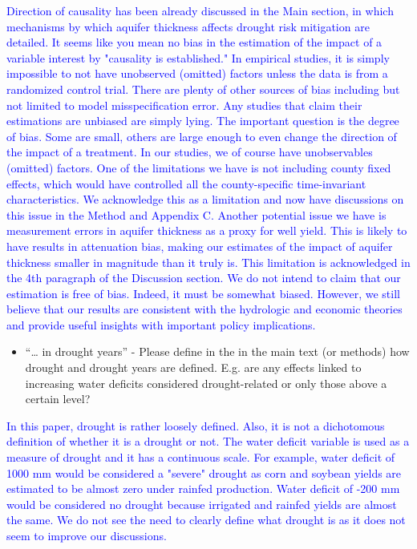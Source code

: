 \documentclass[
]{article}
\providecommand{\tightlist}{%
  \setlength{\itemsep}{0pt}\setlength{\parskip}{0pt}}
\begin{document}
\textcolor{blue}{Direction of causality has been already discussed in the Main section, in which mechanisms by which aquifer thickness affects drought risk mitigation are detailed. It seems like you mean no bias in the estimation of the impact of a variable interest by "causality is established." In empirical studies, it is simply impossible to not have unobserved (omitted) factors unless the data is from a randomized control trial. There are plenty of other sources of bias including but not limited to model misspecification error. Any studies that claim their estimations are unbiased are simply lying. The important question is the degree of bias. Some are small, others are large enough to even change the direction of the impact of a treatment. In our studies, we of course have unobservables (omitted) factors. One of the limitations we have is not including county fixed effects, which would have controlled all the county-specific time-invariant characteristics. We acknowledge this as a limitation and now have discussions on this issue in the Method and Appendix C. Another potential issue we have is measurement errors in aquifer thickness as a proxy for well yield. This is likely to have results in attenuation bias, making our estimates of the impact of aquifer thickness smaller in magnitude than it truly is. This limitation is acknowledged in the 4th paragraph of the Discussion section. We do not intend to claim that our estimation is free of bias. Indeed, it must be somewhat biased. However, we still believe that our results are consistent with the hydrologic and economic theories and provide useful insights with important policy implications.}

\begin{itemize}
\tightlist
\item
  ``\ldots{} in drought years'' - Please define in the in the main text
  (or methods) how drought and drought years are defined. E.g. are any
  effects linked to increasing water deficits considered drought-related
  or only those above a certain level?
\end{itemize}

\textcolor{blue}{In this paper, drought is rather loosely defined. Also, it is not a dichotomous definition of whether it is a drought or not. The water deficit variable is used as a measure of drought and it has a continuous scale. For example, water deficit of 1000 mm would be considered a "severe" drought as corn and soybean yields are estimated to be almost zero under rainfed production. Water deficit of -200 mm would be considered no drought because irrigated and rainfed yields are almost the same. We do not see the need to clearly define what drought is as it does not seem to improve our discussions.}
\end{document}

